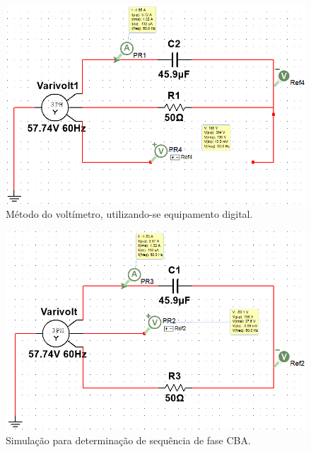 \documentclass[a4paper,12pt,oneside,openany,table,xcdraw]{article}
\begin{document}
\begin{figure}[H]
\centering
\includegraphics[width=13cm]{m1-sim-abc}
\caption{Método do voltímetro, utilizando-se equipamento digital.}
\label{m1:sim:abc}
\end{figure}

\vspace{0.2cm}
\begin{figure}[H]
\centering
\includegraphics[width=13cm]{m1-sim-cba}
\caption{Simulação para determinação de sequência de fase CBA.}
\label{m1:sim:cba}
\end{figure}
\end{document}
